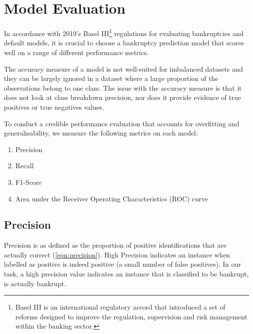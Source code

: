 


\section{Model Evaluation}
\label{sec:modelEval}
In accordance with 2019's Basel III\footnote{Basel III is an international regulatory accord that introduced a set of reforms designed to improve the regulation, supervision and risk management within the banking sector.} 
regulations for evaluating bankruptcies and default models, it is crucial to choose a bankruptcy prediction model that scores well on a range of different performance metrics. 

The accuracy measure of a model is not well-suited for imbalanced datasets and they can be largely ignored in a dataset where a large proportion of the observations belong to one class. The issue with the accuracy measure is that it does not look at class breakdown precision, nor does it provide evidence of true positives or true negatives values. 

To conduct a credible performance evaluation that accounts for overfitting and generalisability, we measure the following metrics on each model:
\begin{enumerate}
    \item Precision
    \item Recall
    \item F1-Score
    \item Area under the Receiver Operating Characteristics (ROC) curve
    
\end{enumerate}

\subsection{Precision}
Precision is as defined as the proportion of positive identifications that are actually correct (\autoref{eqn:precision}). High Precision indicates an instance when labelled as positive is indeed positive (a small number of false positives).
In our task, a high precision value indicates an instance that is classified to be bankrupt, is actually bankrupt.

